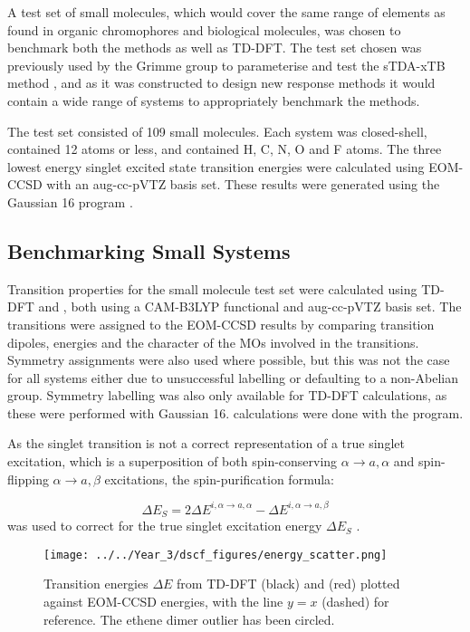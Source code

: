 A test set of small molecules, which would cover the same range of elements as found
in organic chromophores and biological molecules, was chosen to benchmark both the
\dscf methods as well as TD-DFT. The test set chosen was previously used by the 
Grimme group to parameterise and test the sTDA-xTB method \cite{Grimme2017}, and
as it was constructed to design new response methods it would contain a wide range
of systems to appropriately benchmark the \dscf methods.

The test set consisted of 109 small molecules. Each system was closed-shell, contained
12 atoms or less, and contained H, C, N, O and F atoms. The three lowest energy
singlet excited state transition energies were calculated using EOM-CCSD with an
aug-cc-pVTZ basis set. These results were generated using the Gaussian 16 program
\cite{Gaussian16}.

\subsection{Benchmarking Small Systems}
\label{subsec:smalltest}
Transition properties for the small molecule test set were calculated using TD-DFT 
and \dscf, both using a CAM-B3LYP functional and aug-cc-pVTZ basis set. The transitions
were assigned to the EOM-CCSD results by comparing transition dipoles, energies and 
the character of the MOs involved in the transitions. Symmetry assignments were
also used where possible, but this was not the case for all systems either due to
unsuccessful labelling or defaulting to a non-Abelian group. Symmetry labelling 
was also only available for TD-DFT calculations, as these were performed with Gaussian
16. \dscf calculations were done with the  program.

As the \dscf singlet transition is not a correct representation of a true singlet
excitation, which is a superposition of both spin-conserving $\alpha \rightarrow a,
\alpha$ and spin-flipping $\alpha \rightarrow a, \beta$ excitations, the spin-purification 
formula:

\begin{equation}
\Delta E_S = 2\Delta E^{i,\alpha \rightarrow a, \alpha} - \Delta E^{i,\alpha \rightarrow a, \beta}
\end{equation}
%
was used to correct for the true singlet excitation energy $\Delta E_S$ \cite{Ziegler1977}.

\begin{figure}
\centering
\texttt{[image: ../../Year\_3/dscf\_figures/energy\_scatter.png]}
\caption{Transition energies $\Delta E$ from TD-DFT (black) and \dscf (red)
 plotted against EOM-CCSD energies, with the line $y=x$ (dashed) for reference.
 The ethene dimer outlier has been circled.}
\label{fig:energy_scatter}
\end{figure}

